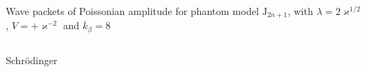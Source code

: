 \documentclass[9pt]{beamer}
\begin{document}
\begin{frame}%
{Wave packets of Poissonian amplitude for phantom model}%
{$\mathrm{J}_{2n+1}$, with $\lambda = 2\varkappa^{1/2}$,
$V = +\varkappa^{-2}$ and $\overline{k}_\beta = 8$}
\begin{columns}
\begin{column}{.49\textwidth}
\begin{block}{Schrödinger}

\end{block}
\end{column}
\end{columns}
\end{frame}
\end{document}
